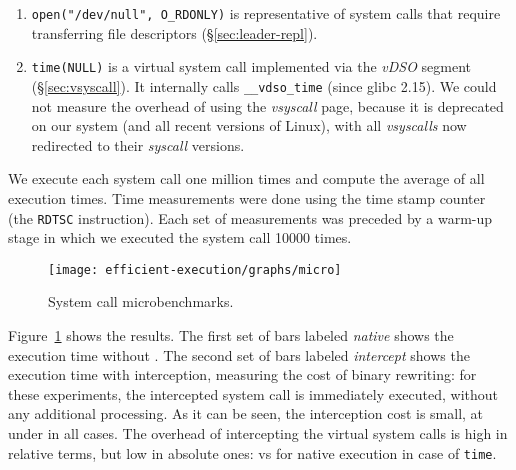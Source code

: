\begin{enumerate}
\item \lstinline`open("/dev/null", O_RDONLY)` is representative of system calls that
  require transferring file descriptors (\S\ref{sec:leader-repl}).

\item \lstinline`time(NULL)` is a virtual system call implemented via the
  \textit{vDSO} segment (\S\ref{sec:vsyscall}). It internally calls
  \lstinline`__vdso_time` (since glibc 2.15).  We could not measure
  the overhead of using the \textit{vsyscall} page, because it is
  deprecated on our system (and all recent versions of Linux), with
  all \textit{vsyscalls} now redirected to their \textit{syscall}
  versions.

\end{enumerate}


We execute each system call one million times and compute the average
of all execution times.  Time measurements were done using the time
stamp counter (\ie the \lstinline`RDTSC` instruction). Each set of
measurements was preceded by a warm-up stage in which we executed the
system call \num{10000} times. %

\begin{figure}[!t]
  \centering
  \texttt{[image: efficient-execution/graphs/micro]}
  \caption{System call microbenchmarks.}
  \label{fig:micro_syscall}
\end{figure}


Figure~\ref{fig:micro_syscall} shows the results.  The first set of
bars labeled \textit{native} shows the execution time without \varan.
The second set of bars labeled \textit{intercept} shows the execution
time with interception, measuring the cost of binary rewriting: for
these experiments, the intercepted system call is immediately
executed, without any additional processing.  As it can be seen, the
interception cost is small, at under \maxInterceptOvh in all
cases. The overhead of intercepting the virtual system calls is high
in relative terms, but low in absolute ones: \vdsoIntercept vs
\vdsoNative for native execution in case of \lstinline`time`.

